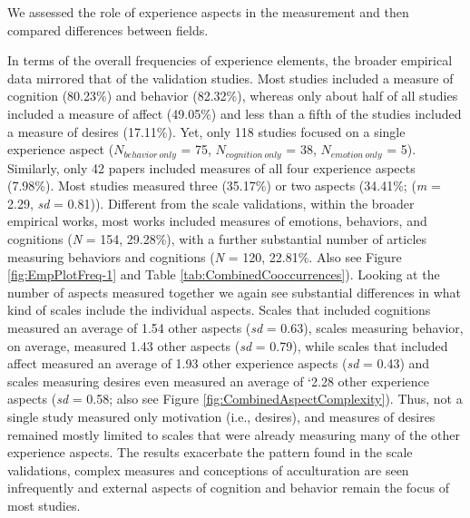 We assessed the role of experience aspects in the measurement and then
compared differences between fields.

In terms of the overall frequencies of experience elements, the broader
empirical data mirrored that of the validation studies. Most studies
included a measure of cognition (80.23\%) and behavior (82.32\%),
whereas only about half of all studies included a measure of affect
(49.05\%) and less than a fifth of the studies included a measure of
desires (17.11\%). Yet, only 118 studies focused on a single experience
aspect (\(N_{behavior\ only}\) = 75, \(N_{cognition\ only}\) = 38,
\(N_{emotion\ only}\) = 5). Similarly, only 42 papers included measures
of all four experience aspects (7.98\%). Most studies measured three
(35.17\%) or two aspects (34.41\%; (\textit{m} = 2.29, \textit{sd} =
0.81)). Different from the scale validations, within the broader
empirical works, most works included measures of emotions, behaviors,
and cognitions (\textit{N} = 154, 29.28\%), with a further substantial
number of articles measuring behaviors and cognitions (\textit{N} = 120,
22.81\%. Also see Figure \ref{fig:EmpPlotFreq-1} and Table
\ref{tab:CombinedCooccurrences}). Looking at the number of aspects
measured together we again see substantial differences in what kind of
scales include the individual aspects. Scales that included cognitions
measured an average of 1.54 other aspects (\textit{sd} = 0.63), scales
measuring behavior, on average, measured 1.43 other aspects (\textit{sd}
= 0.79), while scales that included affect measured an average of 1.93
other experience aspects (\textit{sd} = 0.43) and scales measuring
desires even measured an average of `2.28 other experience aspects
(\textit{sd} = 0.58; also see Figure
\ref{fig:CombinedAspectComplexity}). Thus, not a single study measured
only motivation (i.e., desires), and measures of desires remained mostly
limited to scales that were already measuring many of the other
experience aspects. The results exacerbate the pattern found in the
scale validations, complex measures and conceptions of acculturation are
seen infrequently and external aspects of cognition and behavior remain
the focus of most studies.

